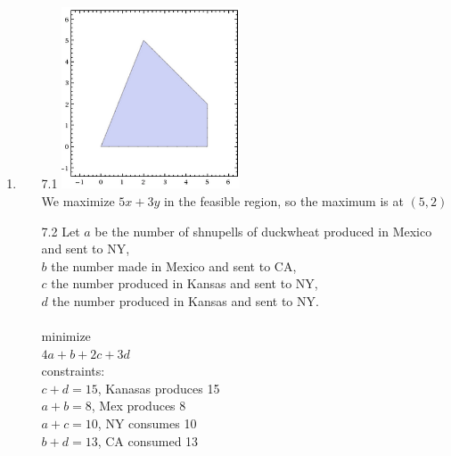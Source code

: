 \documentclass[11pt]{article}
\begin{document}
\begin{enumerate}
\begin{enumerate}
\end{enumerate}
\newpage
\item
\begin{enumerate}
\item[7.1]
\includegraphics[width=200px]{graph.png}\\
We maximize $5x+3y$ in the feasible region, so the maximum is at $(5,2)$
\item[7.2] Let $a$ be the number of shnupells of duckwheat produced in Mexico and sent to NY, \\
$b$ the number made in Mexico and sent to CA, \\
$c$ the number produced in Kansas and sent to NY, \\
$d$ the number produced in Kansas and sent to NY.\\
\\
minimize \\
$4a+b+2c+3d$\\
constraints: \\
$c+d = 15$, Kanasas produces 15\\
$a+b=8$, Mex produces 8\\
$a+c=10$, NY consumes 10\\
$b+d=13$, CA consumed 13\\
\end{enumerate}
\end{enumerate}
\end{document}

